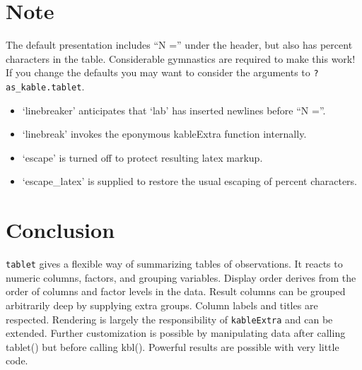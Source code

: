 \documentclass[
]{article}
\providecommand{\tightlist}{%
  \setlength{\itemsep}{0pt}\setlength{\parskip}{0pt}}
\begin{document}
\section{Note}\label{note}

The default presentation includes ``N ='' under the header, but also has
percent characters in the table. Considerable gymnastics are required to
make this work! If you change the defaults you may want to consider the
arguments to \texttt{?as\_kable.tablet}.

\begin{itemize}
\tightlist
\item
  `linebreaker' anticipates that `lab' has inserted newlines before ``N
  =''.
\item
  `linebreak' invokes the eponymous kableExtra function internally.
\item
  `escape' is turned off to protect resulting latex markup.
\item
  `escape\_latex' is supplied to restore the usual escaping of percent
  characters.
\end{itemize}

\section{Conclusion}\label{conclusion}

\texttt{tablet} gives a flexible way of summarizing tables of
observations. It reacts to numeric columns, factors, and grouping
variables. Display order derives from the order of columns and factor
levels in the data. Result columns can be grouped arbitrarily deep by
supplying extra groups. Column labels and titles are respected.
Rendering is largely the responsibility of \texttt{kableExtra} and can
be extended. Further customization is possible by manipulating data
after calling tablet() but before calling kbl(). Powerful results are
possible with very little code.
\end{document}
